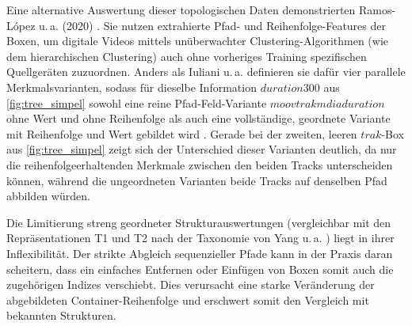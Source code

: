 Eine alternative Auswertung dieser topologischen Daten demonstrierten Ramos-López u.\,a. (2020) \cite{ramos_lopez_digital_2020}. Sie nutzen extrahierte Pfad- und Reihenfolge-Features der Boxen, um digitale Videos mittels unüberwachter Clustering-Algorithmen (wie dem hierarchischen Clustering) auch ohne vorheriges Training spezifischen Quellgeräten zuzuordnen. Anders als Iuliani u.\,a. definieren sie dafür vier parallele Merkmalsvarianten, sodass für dieselbe Information \(duration300\) aus \cref{fig:tree_simpel} sowohl eine reine Pfad-Feld-Variante \(moovtrakmdiaduration\) ohne Wert und ohne Reihenfolge als auch eine vollständige, geordnete Variante mit Reihenfolge und Wert gebildet wird \cite[Kap. III.A]{ramos_lopez_digital_2020}. Gerade bei der zweiten, leeren \(trak\)-Box aus \cref{fig:tree_simpel} zeigt sich der Unterschied dieser Varianten deutlich, da nur die reihenfolgeerhaltenden Merkmale zwischen den beiden Tracks unterscheiden können, während die ungeordneten Varianten beide Tracks auf denselben Pfad abbilden würden.

Die Limitierung streng geordneter Strukturauswertungen (vergleichbar mit den Repräsentationen T1 und T2 nach der Taxonomie von Yang u.\,a. \cite{yang_comprehensive_2025}) liegt in ihrer Inflexibilität. Der strikte Abgleich sequenzieller Pfade kann in der Praxis daran scheitern, dass ein einfaches Entfernen oder Einfügen von Boxen somit auch die zugehörigen Indizes verschiebt. Dies verursacht eine starke Veränderung der abgebildeten Container-Reihenfolge und erschwert somit den Vergleich mit bekannten Strukturen.


